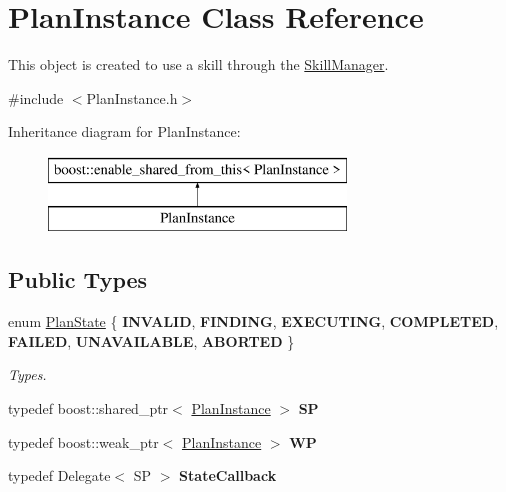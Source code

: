 \hypertarget{class_plan_instance}{}\section{Plan\+Instance Class Reference}
\label{class_plan_instance}


This object is created to use a skill through the \hyperlink{class_skill_manager}{Skill\+Manager}.  




{\ttfamily \#include $<$Plan\+Instance.\+h$>$}

Inheritance diagram for Plan\+Instance\+:\begin{figure}[H]
\begin{center}
\leavevmode
\includegraphics[height=2.000000cm]{class_plan_instance}
\end{center}
\end{figure}
\subsection*{Public Types}
\begin{DoxyCompactItemize}
\item 
\mbox{\label{class_plan_instance_a327a14fdda85d66c88d053b970a7b090}} 
enum \hyperlink{class_plan_instance_a327a14fdda85d66c88d053b970a7b090}{Plan\+State} \{ \newline
{\bfseries I\+N\+V\+A\+L\+ID}, 
{\bfseries F\+I\+N\+D\+I\+NG}, 
{\bfseries E\+X\+E\+C\+U\+T\+I\+NG}, 
{\bfseries C\+O\+M\+P\+L\+E\+T\+ED}, 
\newline
{\bfseries F\+A\+I\+L\+ED}, 
{\bfseries U\+N\+A\+V\+A\+I\+L\+A\+B\+LE}, 
{\bfseries A\+B\+O\+R\+T\+ED}
 \}\begin{DoxyCompactList}\small\item\em Types. \end{DoxyCompactList}
\item 
\mbox{\label{class_plan_instance_a9b591ea3150ee8c730516d6373e5d424}} 
typedef boost\+::shared\+\_\+ptr$<$ \hyperlink{class_plan_instance}{Plan\+Instance} $>$ {\bfseries SP}
\item 
\mbox{\label{class_plan_instance_af626bdd33f7b8a6577c437cca585b6bf}} 
typedef boost\+::weak\+\_\+ptr$<$ \hyperlink{class_plan_instance}{Plan\+Instance} $>$ {\bfseries WP}
\item 
\mbox{\label{class_plan_instance_a9aebc14f1c7644ff749554b90587288a}} 
typedef Delegate$<$ SP $>$ {\bfseries State\+Callback}
\end{DoxyCompactItemize}

